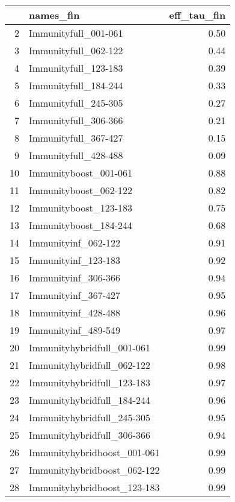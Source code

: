 \begin{table}[ht]
\centering
\begin{tabular}{rlr}
  \hline
 & names\_fin & eff\_tau\_fin \\ 
  \hline
2 & Immunityfull\_001-061 & 0.50 \\ 
  3 & Immunityfull\_062-122 & 0.44 \\ 
  4 & Immunityfull\_123-183 & 0.39 \\ 
  5 & Immunityfull\_184-244 & 0.33 \\ 
  6 & Immunityfull\_245-305 & 0.27 \\ 
  7 & Immunityfull\_306-366 & 0.21 \\ 
  8 & Immunityfull\_367-427 & 0.15 \\ 
  9 & Immunityfull\_428-488 & 0.09 \\ 
  10 & Immunityboost\_001-061 & 0.88 \\ 
  11 & Immunityboost\_062-122 & 0.82 \\ 
  12 & Immunityboost\_123-183 & 0.75 \\ 
  13 & Immunityboost\_184-244 & 0.68 \\ 
  14 & Immunityinf\_062-122 & 0.91 \\ 
  15 & Immunityinf\_123-183 & 0.92 \\ 
  16 & Immunityinf\_306-366 & 0.94 \\ 
  17 & Immunityinf\_367-427 & 0.95 \\ 
  18 & Immunityinf\_428-488 & 0.96 \\ 
  19 & Immunityinf\_489-549 & 0.97 \\ 
  20 & Immunityhybridfull\_001-061 & 0.99 \\ 
  21 & Immunityhybridfull\_062-122 & 0.98 \\ 
  22 & Immunityhybridfull\_123-183 & 0.97 \\ 
  23 & Immunityhybridfull\_184-244 & 0.96 \\ 
  24 & Immunityhybridfull\_245-305 & 0.95 \\ 
  25 & Immunityhybridfull\_306-366 & 0.94 \\ 
  26 & Immunityhybridboost\_001-061 & 0.99 \\ 
  27 & Immunityhybridboost\_062-122 & 0.99 \\ 
  28 & Immunityhybridboost\_123-183 & 0.99 \\ 
   \hline
\end{tabular}
\end{table}
